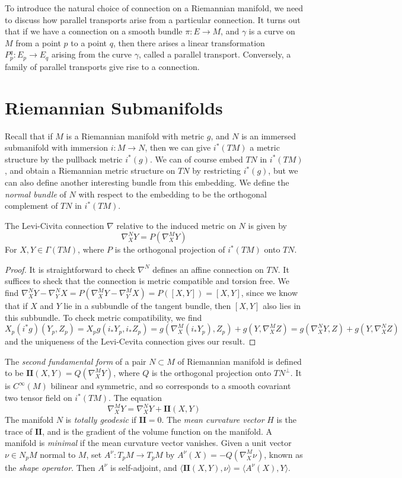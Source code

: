To introduce the natural choice of connection on a Riemannian manifold, we need to discuss how parallel transports arise from a particular connection. It turns out that if we have a connection on a smooth bundle $\pi: E \to M$, and $\gamma$ is a curve on $M$ from a point $p$ to a point $q$, then there arises a linear transformation $P_p^q: E_p \to E_q$ arising from the curve $\gamma$, called a parallel transport. Conversely, a family of parallel transports give rise to a connection.

\section{Riemannian Submanifolds}

Recall that if $M$ is a Riemannian manifold with metric $g$, and $N$ is an immersed submanifold with immersion $i: M \to N$, then we can give $i^*(TM)$ a metric structure by the pullback metric $i^*(g)$. We can of course embed $TN$ in $i^*(TM)$, and obtain a Riemannian metric structure on $TN$ by restricting $i^*(g)$, but we can also define another interesting bundle from this embedding. We define the \emph{normal bundle} of $N$ with respect to the embedding to be the orthogonal complement of $TN$ in $i^*(TM)$.

\begin{theorem}
    The Levi-Civita connection $\nabla$ relative to the induced metric on $N$ is given by
    \[ \nabla^N_X Y = P(\nabla^M_X Y) \]
    For $X,Y \in \Gamma(TM)$, where $P$ is the orthogonal projection of $i^*(TM)$ onto $TN$.
\end{theorem}
\begin{proof}
    It is straightforward to check $\nabla^N$ defines an affine connection on $TN$. It suffices to sheck that the connection is metric compatible and torsion free. We find $\nabla^N_X Y - \nabla^N_Y X = P(\nabla^M_X Y - \nabla^M_Y X) = P([X,Y]) = [X,Y]$, since we know that if $X$ and $Y$ lie in a subbundle of the tangent bundle, then $[X,Y]$ also lies in this subbundle. To check metric compatibility, we find
    \[ X_p (i^*g)(Y_p,Z_p) = X_p g(i_* Y_p, i_* Z_p) = g(\nabla^M_X (i_* Y_p), Z_p) + g(Y, \nabla^M_X Z) = g(\nabla^N_X Y, Z) + g(Y, \nabla^N_X Z) \]
    and the uniqueness of the Levi-Cevita connection gives our result.
\end{proof}

The \emph{second fundamental form} of a pair $N \subset M$ of Riemannian manifold is defined to be $\mathbf{II}(X,Y) = Q(\nabla^M_X Y)$, where $Q$ is the orthogonal projection onto $TN^\perp$. It is $C^\infty(M)$ bilinear and symmetric, and so corresponds to a smooth covariant two tensor field on $i^*(TM)$. The equation
%
\[ \nabla^M_X Y = \nabla^N_X Y + \mathbf{II}(X,Y) \]
%
The manifold $N$ is \emph{totally geodesic} if $\mathbf{II} = 0$. The \emph{mean curvature vector} $H$ is the trace of $\mathbf{II}$, and is the gradient of the volume function on the manifold. A manifold is \emph{minimal} if the mean curvature vector vanishes. Given a unit vector $\nu \in N_p M$ normal to $M$, set $A^\nu: T_p M \to T_p M$ by $A^\nu(X) = -Q(\nabla^M_X \nu)$, known as the \emph{shape operator}. Then $A^\nu$ is self-adjoint, and $\langle \mathbf{II}(X,Y), \nu \rangle = \langle A^\nu(X), Y \rangle$.

